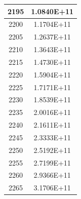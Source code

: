 \documentclass[a4paper]{article}
\begin{document}
\begin{tabular}{| c | c |}
    	2195 & 1.0840E+11 \\\hline
    	2200 & 1.1704E+11 \\\hline
    	2205 & 1.2637E+11 \\\hline
    	2210 & 1.3643E+11 \\\hline
    	2215 & 1.4730E+11 \\\hline
    	2220 & 1.5904E+11 \\\hline
    	2225 & 1.7171E+11 \\\hline
    	2230 & 1.8539E+11 \\\hline
    	2235 & 2.0016E+11 \\\hline
    	2240 & 2.1611E+11 \\\hline
    	2245 & 2.3333E+11 \\\hline
    	2250 & 2.5192E+11 \\\hline
    	2255 & 2.7199E+11 \\\hline
    	2260 & 2.9366E+11 \\\hline
    	2265 & 3.1706E+11 \\\hline
    \end{tabular}
    \hfill
\end{document}
